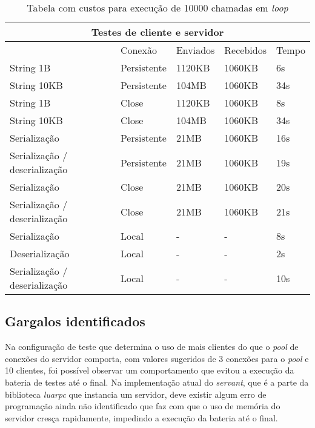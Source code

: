 \documentclass[11pt]{article}
\begin{document}
\renewcommand{\arraystretch}{2}
\begin{table}
\begin{center}
{\footnotesize \begin{tabular}{p{2.5cm} p{2.5cm} p{2.5cm} p{2.5cm} p{2.5cm}}
\hline
\multicolumn{5}{c}{Testes de cliente e servidor} \\ \hline
~ & Conexão & Enviados & Recebidos & Tempo \\ \hline
String 1B & Persistente & 1120KB & 1060KB & 6s \\
String 10KB & Persistente & 104MB & 1060KB & 34s \\
String 1B & Close & 1120KB & 1060KB & 8s \\
String 10KB & Close & 104MB & 1060KB & 34s \\
Serialização & Persistente & 21MB & 1060KB & 16s \\
Serialização / deserialização & Persistente & 21MB & 1060KB & 19s \\
Serialização & Close & 21MB & 1060KB & 20s \\
Serialização / deserialização & Close & 21MB & 1060KB & 21s \\
Serialização & Local & - & - & 8s \\
Deserialização & Local & - & - & 2s \\
Serialização / deserialização & Local & - & - & 10s \\
\hline
\end{tabular}}
\caption{Tabela com custos para execução de 10000 chamadas em \textit{loop}}
\label{tab:perfsize}
\end{center}
\end{table}

\subsection{Gargalos identificados}\label{subsec:bottle}

Na configuração de teste que determina o uso de mais clientes do que o
\textit{pool} de conexões do servidor comporta, com valores sugeridos de 3
conexões para o \textit{pool} e 10 clientes, foi possível observar um
comportamento que evitou a execução da bateria de testes até o final. Na
implementação atual do \textit{servant}, que é a parte da biblioteca
\textit{luarpc} que instancia um servidor, deve existir algum erro de
programação ainda não identificado que faz com que o uso de memória do servidor
cresça rapidamente, impedindo a execução da bateria até o final.
\end{document}
